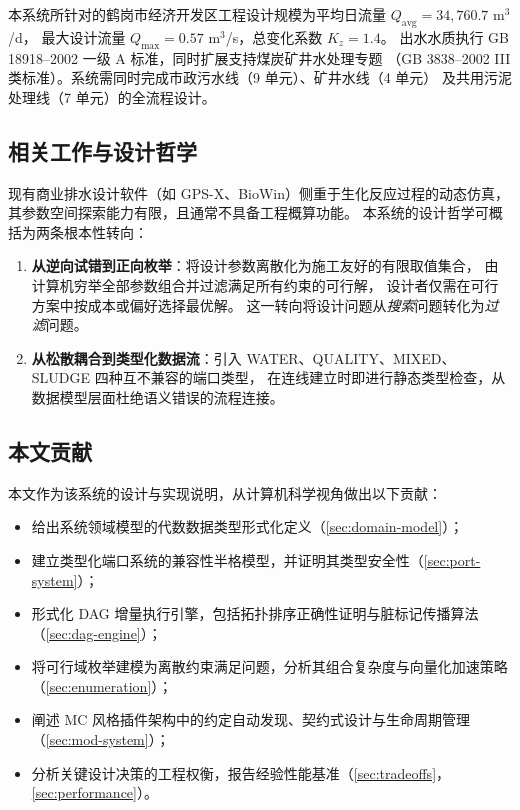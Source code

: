 \documentclass[12pt,a4paper]{ctexart}
\theoremstyle{definition}
\theoremstyle{remark}
\begin{document}
本系统所针对的鹤岗市经济开发区工程设计规模为平均日流量 $Q_{\text{avg}} = 34,760.7$ m$^3$/d，
最大设计流量 $Q_{\text{max}} = 0.57$ m$^3$/s，总变化系数 $K_z = 1.4$。
出水水质执行 GB 18918--2002 一级 A 标准，同时扩展支持煤炭矿井水处理专题
（GB 3838--2002 III 类标准）。系统需同时完成市政污水线（9 单元）、矿井水线（4 单元）
及共用污泥处理线（7 单元）的全流程设计。

\subsection{相关工作与设计哲学}

现有商业排水设计软件（如 GPS-X、BioWin）侧重于生化反应过程的动态仿真，
其参数空间探索能力有限，且通常不具备工程概算功能。
本系统的设计哲学可概括为两条根本性转向：
\begin{enumerate}
  \item \textbf{从逆向试错到正向枚举}：将设计参数离散化为施工友好的有限取值集合，
        由计算机穷举全部参数组合并过滤满足所有约束的可行解，
        设计者仅需在可行方案中按成本或偏好选择最优解。
        这一转向将设计问题从\textit{搜索}问题转化为\textit{过滤}问题。
  \item \textbf{从松散耦合到类型化数据流}：引入 WATER、QUALITY、MIXED、SLUDGE 四种互不兼容的端口类型，
        在连线建立时即进行静态类型检查，从数据模型层面杜绝语义错误的流程连接。
\end{enumerate}

\subsection{本文贡献}

本文作为该系统的设计与实现说明，从计算机科学视角做出以下贡献：
\begin{itemize}
  \item 给出系统领域模型的代数数据类型形式化定义（\cref{sec:domain-model}）；
  \item 建立类型化端口系统的兼容性半格模型，并证明其类型安全性（\cref{sec:port-system}）；
  \item 形式化 DAG 增量执行引擎，包括拓扑排序正确性证明与脏标记传播算法（\cref{sec:dag-engine}）；
  \item 将可行域枚举建模为离散约束满足问题，分析其组合复杂度与向量化加速策略（\cref{sec:enumeration}）；
  \item 阐述 MC 风格插件架构中的约定自动发现、契约式设计与生命周期管理（\cref{sec:mod-system}）；
  \item 分析关键设计决策的工程权衡，报告经验性能基准（\cref{sec:tradeoffs}，\cref{sec:performance}）。
\end{itemize}
\end{document}
